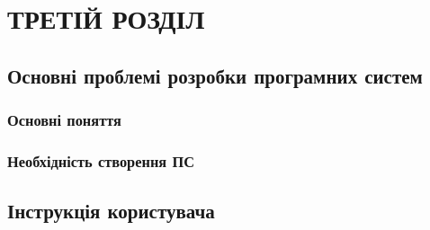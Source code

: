 ﻿\section{ТРЕТІЙ РОЗДІЛ}
\subsection{Основні проблемі розробки програмних систем}
\subsubsection{Основні поняття}
\subsubsection{Необхідність створення ПС}
\subsection{Інструкція користувача}

